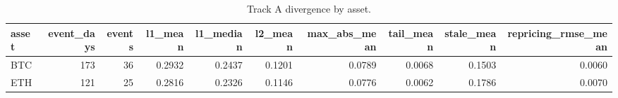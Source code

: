 \begin{table}
\caption{Track A divergence by asset.}
\label{tab:trackA_divergence_by_asset}
\begin{tabular}{lrrrrrrrrr}
\toprule
asset & event\_days & events & l1\_mean & l1\_median & l2\_mean & max\_abs\_mean & tail\_mean & stale\_mean & repricing\_rmse\_mean \\
\midrule
BTC & 173 & 36 & 0.2932 & 0.2437 & 0.1201 & 0.0789 & 0.0068 & 0.1503 & 0.0060 \\
ETH & 121 & 25 & 0.2816 & 0.2326 & 0.1146 & 0.0776 & 0.0062 & 0.1786 & 0.0070 \\
\bottomrule
\end{tabular}
\end{table}
